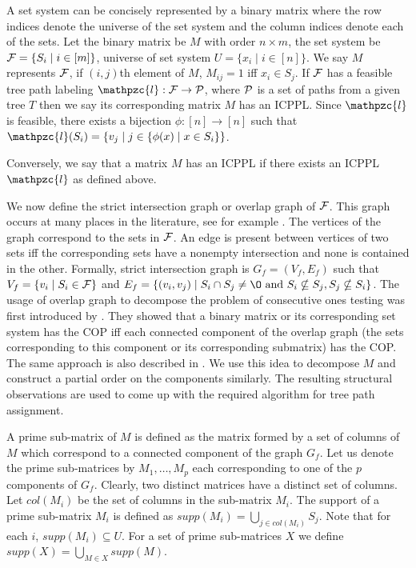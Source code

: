 \documentclass{llncs}
\def\cA{{\cal A}}
\def\cF{{\cal F}}
\def\cP{{\cal P}}
\def\cl{\mathpzc{l}}
\begin{document}
\noindent
A set system can be concisely represented by a binary matrix where the
row indices denote the universe of the set system and the column
indices denote each of the sets. Let the binary matrix be $M$ with
order $n \times m$, the set system be $\cF = \{S_i \mid i \in [m]\}$,
universe of set system $U = \{x_i \mid i \in [n]\}$. We say $M$ represents
$\cF$, if $(i,j)$th element of $M$, $M_{ij} =
1$ iff $x_i \in S_j$. If $\cF$ has a feasible tree path labeling $\cl:
\cF \rightarrow \cP$, where $\cP$ is a set of paths from a given tree
$T$
then we say its 
corresponding matrix $M$ has an ICPPL. Since $\cl$ is feasible, there
exists a bijection $\phi: [n] \rightarrow [n]$ such that $\cl(S_i) =
\{v_j \mid j \in \{ \phi(x) \mid x \in S_i\} \}$.

Conversely, we say that a matrix
$M$ has an ICPPL if there exists an ICPPL $\cl$ as defined
above.

\noindent
We now define the strict intersection graph or overlap graph of
$\cF$. This graph occurs at many places in the literature, see for
example \cite{kklv10, wlh02, nsnrs09}. The vertices of the graph
correspond to the sets in $\cF$.  An edge is present between vertices
of two sets iff the corresponding sets have a nonempty intersection
and none is contained in the other. Formally, strict intersection graph is
$G_f = (V_f, E_f)$ such that $V_f = \{v_i \mid S_i \in \cF\}$ and $E_f
= \{(v_i, v_j) \mid S_i \cap S_j \ne \O \text{ and }S_i \nsubseteq
S_j, S_j \nsubseteq S_i \}$.  The usage of overlap graph to
decompose the problem of consecutive ones testing was first introduced
by \cite{fg65}. They showed that a binary matrix or its corresponding
set system has the COP iff each connected component of the overlap
graph (the sets corresponding to this component or its corresponding
submatrix) has the COP. The same approach is also described in
\cite{wlh02,nsnrs09}. We use this idea to decompose $M$ and construct
a partial order on the components similarly. The resulting structural
observations are used to come up with the required algorithm for tree
path assignment. 

A prime sub-matrix of $M$ is defined as the matrix formed by a set of
columns of $M$ which correspond to a connected component of the graph
$G_f$.  Let us denote the prime sub-matrices by $M_1,\ldots,M_p$ each
corresponding to one of the $p$ components of $G_f$. Clearly, two
distinct matrices have a distinct set of columns.  Let $col(M_i)$ be
the set of columns in the sub-matrix $M_i$.  The support of a prime
sub-matrix $M_i$ is defined as $supp(M_i) = \displaystyle \bigcup_{j
  \in col(M_i)}S_j$.  Note that for each $i$, $supp(M_i) \subseteq U$.
For a set of prime sub-matrices $X$ we define
$supp(X) = \displaystyle \bigcup_{M \in X} supp(M)$. \\
\end{document}
